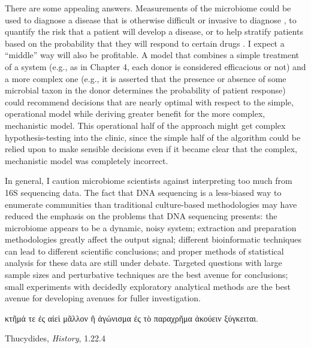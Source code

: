There are some appealing answers. Measurements of the microbiome
could be used to diagnose a disease that is otherwise difficult or
invasive to diagnose \cite{papa-noninvasive-2012}, to quantify the
risk that a patient will develop a disease, or to help stratify
patients based on the probability that they will respond to certain
drugs \cite{koeth-intestinal-2013,sivan-commensal-2015,vetizou-anticancer-2015}.
I expect a ``middle'' way will also be profitable. A model that
combines a simple treatment of a system (e.g., as in Chapter 4,
each donor is considered efficacious or not) and a more complex one
(e.g., it is asserted that the presence or absence of some microbial
taxon in the donor determines the probability of patient response)
could recommend decisions that are nearly optimal with respect to
the simple, operational model while deriving greater benefit for
the more complex, mechanistic model. This operational half of
the approach might get complex hypothesis-testing into the clinic,
since the simple half of the algorithm could be relied upon to
make sensible decisions even if it became clear that the complex,
mechanistic model was completely incorrect.

In general, I caution microbiome scientists against interpreting too
much from 16S sequencing data. The fact that DNA sequencing is a
less-biased way to enumerate communities than traditional 
culture-based methodologies may have reduced the emphasis on the
problems that DNA sequencing presents: the microbiome appears to
be a dynamic, noisy system; extraction and preparation methodologies
greatly affect the output signal; different bioinformatic techniques
can lead to different scientific conclusions; and proper methods
of statistical analysis for these data are still under debate.
Targeted questions with large sample sizes and perturbative
techniques are the best avenue for conclusions; small experiments
with decidedly exploratory analytical methods are the best
avenue for developing avenues for fuller investigation.

\epigraph{{κτῆμά τε ἐς αἰεὶ μᾶλλον
ἢ ἀγώνισμα ἐς τὸ παραχρῆμα ἀκούειν ξύγκειται.}}{Thucydides, \textit{History}, 1.22.4}

\begin{singlespace}


\end{singlespace}
